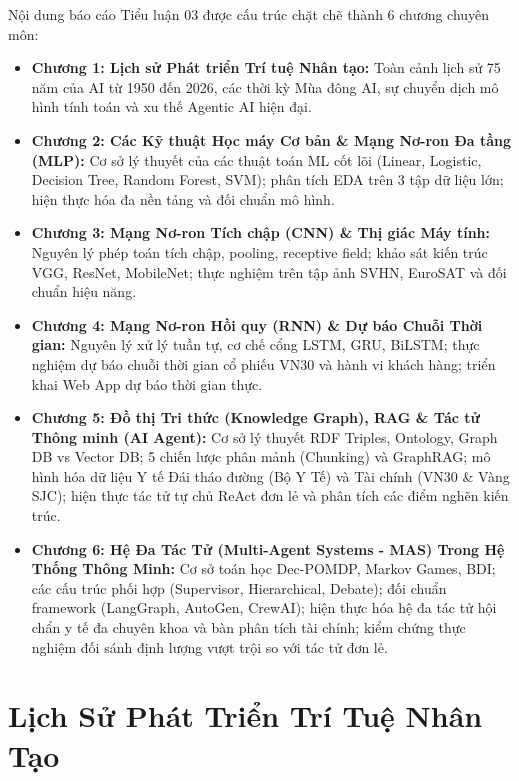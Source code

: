 \documentclass[12pt,a4paper]{report}
\begin{document}
Nội dung báo cáo Tiểu luận 03 được cấu trúc chặt chẽ thành 6 chương chuyên môn:
\begin{itemize}[leftmargin=1.2cm]
    \item \textbf{Chương 1: Lịch sử Phát triển Trí tuệ Nhân tạo:} Toàn cảnh lịch sử 75 năm của AI từ 1950 đến 2026, các thời kỳ Mùa đông AI, sự chuyển dịch mô hình tính toán và xu thế Agentic AI hiện đại.
    \item \textbf{Chương 2: Các Kỹ thuật Học máy Cơ bản \& Mạng Nơ-ron Đa tầng (MLP):} Cơ sở lý thuyết của các thuật toán ML cốt lõi (Linear, Logistic, Decision Tree, Random Forest, SVM); phân tích EDA trên 3 tập dữ liệu lớn; hiện thực hóa đa nền tảng và đối chuẩn mô hình.
    \item \textbf{Chương 3: Mạng Nơ-ron Tích chập (CNN) \& Thị giác Máy tính:} Nguyên lý phép toán tích chập, pooling, receptive field; khảo sát kiến trúc VGG, ResNet, MobileNet; thực nghiệm trên tập ảnh SVHN, EuroSAT và đối chuẩn hiệu năng.
    \item \textbf{Chương 4: Mạng Nơ-ron Hồi quy (RNN) \& Dự báo Chuỗi Thời gian:} Nguyên lý xử lý tuần tự, cơ chế cổng LSTM, GRU, BiLSTM; thực nghiệm dự báo chuỗi thời gian cổ phiếu VN30 và hành vi khách hàng; triển khai Web App dự báo thời gian thực.
    \item \textbf{Chương 5: Đồ thị Tri thức (Knowledge Graph), RAG \& Tác tử Thông minh (AI Agent):} Cơ sở lý thuyết RDF Triples, Ontology, Graph DB vs Vector DB; 5 chiến lược phân mảnh (Chunking) và GraphRAG; mô hình hóa dữ liệu Y tế Đái tháo đường (Bộ Y Tế) và Tài chính (VN30 \& Vàng SJC); hiện thực tác tử tự chủ ReAct đơn lẻ và phân tích các điểm nghẽn kiến trúc.
    \item \textbf{Chương 6: Hệ Đa Tác Tử (Multi-Agent Systems - MAS) Trong Hệ Thống Thông Minh:} Cơ sở toán học Dec-POMDP, Markov Games, BDI; các cấu trúc phối hợp (Supervisor, Hierarchical, Debate); đối chuẩn framework (LangGraph, AutoGen, CrewAI); hiện thực hóa hệ đa tác tử hội chẩn y tế đa chuyên khoa và bàn phân tích tài chính; kiểm chứng thực nghiệm đối sánh định lượng vượt trội so với tác tử đơn lẻ.
\end{itemize}

\newpage


\chapter{Lịch Sử Phát Triển Trí Tuệ Nhân Tạo}
\end{document}
